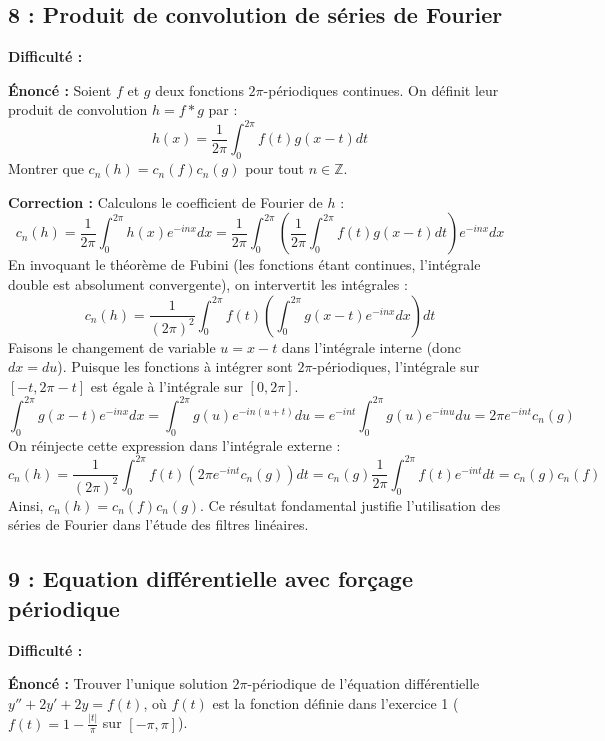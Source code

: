 \documentclass[12pt,a4paper]{article}
\begin{document}
\subsection*{8 : Produit de convolution de séries de Fourier}

\textbf{Difficulté :} \bigstar\bigstar\bigstar\bigstar\star

\textbf{Énoncé :}
Soient $f$ et $g$ deux fonctions $2\pi$-périodiques continues. On définit leur produit de convolution $h = f * g$ par :
$$h(x) = \frac{1}{2\pi} \int_0^{2\pi} f(t) g(x-t) dt$$
Montrer que $c_n(h) = c_n(f) c_n(g)$ pour tout $n \in \mathbb{Z}$.

\textbf{Correction :}
Calculons le coefficient de Fourier de $h$ :
$$c_n(h) = \frac{1}{2\pi} \int_0^{2\pi} h(x) e^{-inx} dx = \frac{1}{2\pi} \int_0^{2\pi} \left( \frac{1}{2\pi} \int_0^{2\pi} f(t) g(x-t) dt \right) e^{-inx} dx$$
En invoquant le théorème de Fubini (les fonctions étant continues, l'intégrale double est absolument convergente), on intervertit les intégrales :
$$c_n(h) = \frac{1}{(2\pi)^2} \int_0^{2\pi} f(t) \left( \int_0^{2\pi} g(x-t) e^{-inx} dx \right) dt$$
Faisons le changement de variable $u = x - t$ dans l'intégrale interne (donc $dx = du$). Puisque les fonctions à intégrer sont $2\pi$-périodiques, l'intégrale sur $[ -t, 2\pi-t ]$ est égale à l'intégrale sur $[ 0, 2\pi ]$.
$$\int_0^{2\pi} g(x-t) e^{-inx} dx = \int_0^{2\pi} g(u) e^{-in(u+t)} du = e^{-int} \int_0^{2\pi} g(u) e^{-inu} du = 2\pi e^{-int} c_n(g)$$
On réinjecte cette expression dans l'intégrale externe :
$$c_n(h) = \frac{1}{(2\pi)^2} \int_0^{2\pi} f(t) \left( 2\pi e^{-int} c_n(g) \right) dt = c_n(g) \frac{1}{2\pi} \int_0^{2\pi} f(t) e^{-int} dt = c_n(g) c_n(f)$$
Ainsi, $c_n(h) = c_n(f) c_n(g)$. Ce résultat fondamental justifie l'utilisation des séries de Fourier dans l'étude des filtres linéaires.


\subsection*{9 : Equation différentielle avec forçage périodique}

\textbf{Difficulté :} \bigstar\bigstar\bigstar\bigstar\bigstar

\textbf{Énoncé :}
Trouver l'unique solution $2\pi$-périodique de l'équation différentielle $y'' + 2y' + 2y = f(t)$, où $f(t)$ est la fonction définie dans l'exercice 1 ($f(t) = 1 - \frac{|t|}{\pi}$ sur $[-\pi, \pi]$).
\end{document}
